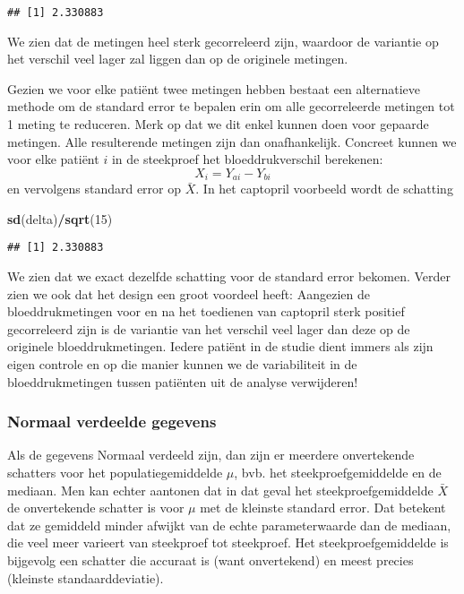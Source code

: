 \documentclass[12pt,dutch,coursenotes]{book}
\newenvironment{Shaded}{\begin{snugshade}}{\end{snugshade}}
\newcommand{\KeywordTok}[1]{\textcolor[rgb]{0.13,0.29,0.53}{\textbf{#1}}}
\newcommand{\DecValTok}[1]{\textcolor[rgb]{0.00,0.00,0.81}{#1}}
\newcommand{\OperatorTok}[1]{\textcolor[rgb]{0.81,0.36,0.00}{\textbf{#1}}}
\newcommand{\NormalTok}[1]{#1}
\theoremstyle{definition}
\theoremstyle{definition}
\theoremstyle{definition}
\theoremstyle{remark}
\begin{document}
\begin{verbatim}
## [1] 2.330883
\end{verbatim}

We zien dat de metingen heel sterk gecorreleerd zijn, waardoor de
variantie op het verschil veel lager zal liggen dan op de originele
metingen.

Gezien we voor elke patiënt twee metingen hebben bestaat een
alternatieve methode om de standard error te bepalen erin om alle
gecorreleerde metingen tot 1 meting te reduceren. Merk op dat we dit
enkel kunnen doen voor gepaarde metingen. Alle resulterende metingen
zijn dan onafhankelijk. Concreet kunnen we voor elke patiënt \(i\) in de
steekproef het bloeddrukverschil berekenen: \[X_{i}=Y_{ai}-Y_{bi}\] en
vervolgens standard error op \(\bar X\). In het captopril voorbeeld
wordt de schatting

\begin{Shaded}
\begin{Highlighting}[]
\KeywordTok{sd}\NormalTok{(delta)}\OperatorTok{/}\KeywordTok{sqrt}\NormalTok{(}\DecValTok{15}\NormalTok{)}
\end{Highlighting}
\end{Shaded}

\begin{verbatim}
## [1] 2.330883
\end{verbatim}

We zien dat we exact dezelfde schatting voor de standard error bekomen.
Verder zien we ook dat het design een groot voordeel heeft: Aangezien de
bloeddrukmetingen voor en na het toedienen van captopril sterk positief
gecorreleerd zijn is de variantie van het verschil veel lager dan deze
op de originele bloeddrukmetingen. Iedere patiënt in de studie dient
immers als zijn eigen controle en op die manier kunnen we de
variabiliteit in de bloeddrukmetingen tussen patiënten uit de analyse
verwijderen!

\subsubsection{Normaal verdeelde
gegevens}\label{normaal-verdeelde-gegevens}

Als de gegevens Normaal verdeeld zijn, dan zijn er meerdere onvertekende
schatters voor het populatiegemiddelde \(\mu\), bvb. het
steekproefgemiddelde en de mediaan. Men kan echter aantonen dat in dat
geval het steekproefgemiddelde \(\bar{X}\) de onvertekende schatter is
voor \(\mu\) met de kleinste standard error. Dat betekent dat ze
gemiddeld minder afwijkt van de echte parameterwaarde dan de mediaan,
die veel meer varieert van steekproef tot steekproef. Het
steekproefgemiddelde is bijgevolg een schatter die accuraat is (want
onvertekend) en meest precies (kleinste standaarddeviatie).
\end{document}
